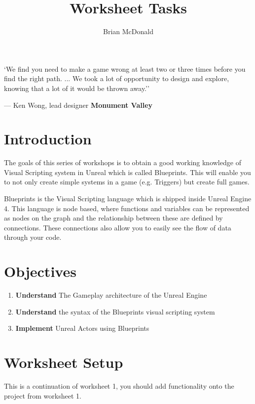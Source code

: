 \documentclass{../../../fal_assignment}
\title{Worksheet Tasks}
\author{Brian McDonald} %
\begin{document}
\maketitle 

\begin{marginquote}
`We find you need to make a game wrong at least two or three times before you find the right path. ...
We took a lot of opportunity to design and explore, knowing that a lot of it would be thrown away.''
\par --- Ken Wong, lead designer \textbf{Monument Valley}
\end{marginquote}


\section*{Introduction}
The goals of this series of workshops is to obtain a good working knowledge of Visual Scripting system in Unreal which is called Blueprints. This will enable you to not only create simple systems in a game (e.g. Triggers) but create full games.

Blueprints is the Visual Scripting language which is shipped inside Unreal Engine 4. This language is node based, where functions and variables can be represented as nodes on the graph and the relationship between these are defined by connections. These connections also allow you to easily see the flow of data through your code. 

\section*{Objectives}
\begin{enumerate}[label=(\Alph*)]
	\item \textbf{Understand} The Gameplay architecture of the Unreal Engine 
	\item \textbf{Understand} the syntax of the Blueprints visual scripting system
	\item \textbf{Implement} Unreal Actors using Blueprints
\end{enumerate}

\section*{Worksheet Setup}

This is a continuation of worksheet 1, you should add functionality onto the project from worksheet 1.
\end{document}
